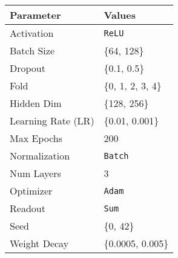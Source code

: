 

\begin{tabular}{ll}
    \toprule
    \textbf{Parameter} & \textbf{Values} \\
    \midrule
    Activation       & \texttt{ReLU} \\
    Batch Size       & \{64, 128\} \\
    Dropout          & \{0.1, 0.5\} \\
    Fold            & \{0, 1, 2, 3, 4\} \\
    Hidden Dim      & \{128, 256\} \\
    Learning Rate (LR) & \{0.01, 0.001\} \\
    Max Epochs      & 200 \\
    Normalization   & \texttt{Batch} \\
    Num Layers      & 3 \\
    Optimizer       & \texttt{Adam} \\
    Readout         & \texttt{Sum} \\
    Seed            & \{0, 42\} \\
    Weight Decay    & \{0.0005, 0.005\} \\
    \bottomrule
\end{tabular}